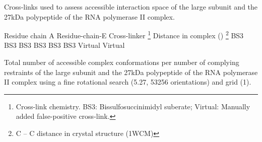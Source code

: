 \caption{}
{Cross-links used to assess accessible interaction space of the large subunit
and the 27kDa polypeptide of the RNA polymerase II complex.}
\stopbuffer

\startlocalfootnotes
\bTABLE
\bTABLEhead
\bTR
\bTD Residue chain A  \eTD \bTD  Residue-chain-E  \eTD 
\bTD  Cross-linker \footnote{Cross-link chemistry. BS3: Bissulfosuccinimidyl suberate; Virtual: Manually added false-positive cross-link.}   \eTD 
\bTD  Distance in complex (\Angstrom) \footnote{C\low{\m{\beta}} -- C\low{\m{\beta}} distance in crystal structure (1WCM)} \eTD
\eTR
\eTABLEhead
\bTABLEbody
\bTR
{}     \eTD {}      \eTD \bTD BS3      \eTD {} \eTD
\eTR
\bTR
{}      \eTD {}      \eTD \bTD BS3      \eTD {} \eTD
\eTR
\bTR
{}      \eTD {}      \eTD \bTD BS3      \eTD {} \eTD
\eTR
\bTR
{}       \eTD {}      \eTD \bTD BS3      \eTD {} \eTD
\eTR
\bTR
{}      \eTD {}      \eTD \bTD BS3      \eTD {} \eTD
\eTR
\bTR
{}      \eTD {}      \eTD \bTD BS3      \eTD {} \eTD
\eTR
\bTR
{}      \eTD {}      \eTD \bTD Virtual  \eTD {} \eTD
\eTR
\bTR
{}     \eTD {}      \eTD \bTD Virtual  \eTD {} \eTD
\eTR
\eTABLEbody
\eTABLE
\placelocalfootnotes
\stoplocalfootnotes
\stopbuffer


\caption{}
{Total number of accessible complex conformations per number of complying
restraints of the large subunit and the 27kDa polypeptide of the RNA polymerase
II complex using a fine rotational search (5.27\Deg, 53256 orientations) and
grid (1\Angstrom).} 
\stopbuffer

